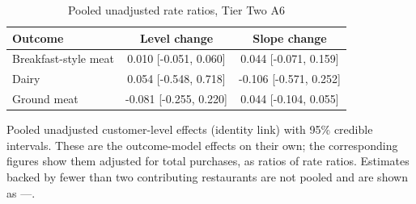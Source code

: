\begin{table}[H]
\centering
\caption{Pooled unadjusted rate ratios, Tier Two A6}
\label{tab:t2_a6_mu_gamma}
\begin{tabular}{lcc}
\toprule
Outcome & Level change & Slope change \\
\midrule
Breakfast-style meat & 0.010 [-0.051, 0.060] & 0.044 [-0.071, 0.159] \\
Dairy & 0.054 [-0.548, 0.718] & -0.106 [-0.571, 0.252] \\
Ground meat & -0.081 [-0.255, 0.220] & 0.044 [-0.104, 0.055] \\
\bottomrule
\end{tabular}
\par\smallskip\footnotesize Pooled unadjusted customer-level effects (identity link) with 95\% credible intervals. These are the outcome-model effects on their own; the corresponding figures show them adjusted for total purchases, as ratios of rate ratios. Estimates backed by fewer than two contributing restaurants are not pooled and are shown as ---.
\end{table}
